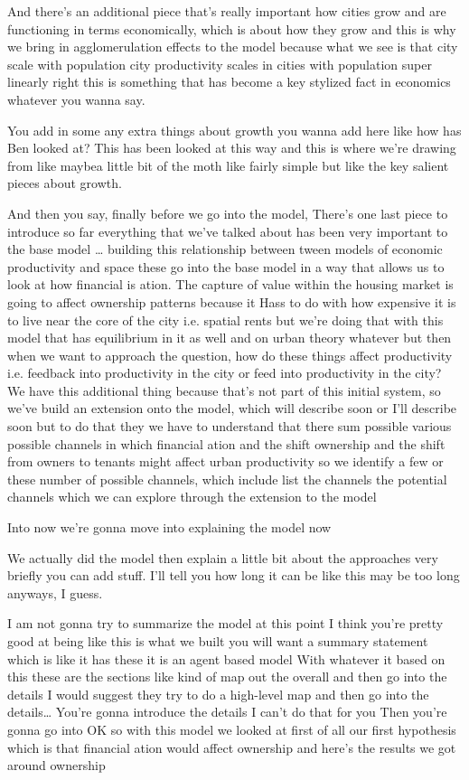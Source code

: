 And there’s an additional piece that’s really important how cities grow and are functioning in terms economically, which is about how they grow and this is why we bring in agglomerulation effects to the model because what we see is that city scale with population city productivity scales in cities with population super linearly right this is something that has become a key stylized fact in economics whatever you wanna say.

You add in some any extra things about growth you wanna add here like how has Ben looked at? This has been looked at this way and this is where we’re drawing from like maybea little bit of the moth like fairly simple but like the key salient pieces about growth.

And then you say, finally before we go into the model, There’s one last piece to introduce so far everything that we’ve talked about has been very important to the base model …  building this relationship between tween models of economic productivity and space these go into the base model in a way that allows us to look at how financial is ation. The capture of value within the housing market is going to affect ownership patterns because it Hass to do with how expensive it is to live near the core of the city i.e. spatial rents but we’re doing that with this model that has equilibrium in it as well and on urban theory whatever but then when we want to approach the question, how do these things affect productivity i.e. feedback into productivity in the city or feed into productivity in the city? We have this additional thing because that’s not part of this initial system, so we’ve build an extension onto the model, which will describe soon or I’ll describe soon but to do that they we have to understand that there sum possible various possible channels in which financial ation and the shift ownership and the shift from owners to tenants might affect urban productivity so we identify a few or these number of possible channels, which include list the channels the potential channels which we can explore through the extension to the model




Into now we’re gonna move into explaining the model now

We actually did the model then explain a little bit about the approaches very briefly you can add stuff. I’ll tell you how long it can be like this may be too long anyways, I guess.

I am not gonna try to summarize the model at this point I think you’re pretty good at being like this is what we built you will want a summary statement which is like it has these it is an agent based model With whatever it based on this these are the sections like kind of map out the overall and then go into the details I would suggest they try to do a high-level map and then go into the details… You’re gonna introduce the details I can’t do that for you
Then you’re gonna go into OK so with this model we looked at first of all our first hypothesis which is that financial ation would affect ownership and here’s the results we got around ownership

